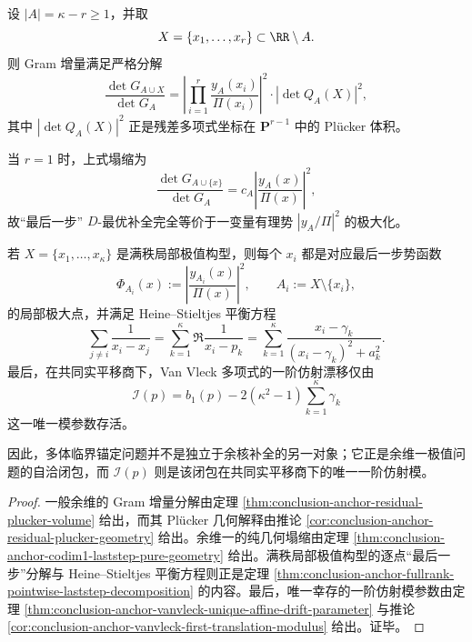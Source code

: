 \begin{theorem}\label{thm:conclusion-anchor-codim-completion-stieltjes-vanvleck-closure}
设 \(|A|=\kappa-r\ge 1\)，并取
\[
X=\{x_1,\dots,x_r\}\subset \RR\setminus A.
\]
则 Gram 增量满足严格分解
\[
\frac{\det G_{A\cup X}}{\det G_A}
=
\left|
\prod_{i=1}^{r}\frac{y_A(x_i)}{\Pi(x_i)}
\right|^2
\cdot
|\det Q_A(X)|^2,
\]
其中 \( |\det Q_A(X)|^2 \) 正是残差多项式坐标在 \(\mathbf P^{r-1}\) 中的 Pl\"ucker 体积。

当 \(r=1\) 时，上式塌缩为
\[
\frac{\det G_{A\cup\{x\}}}{\det G_A}
=
c_A\left|\frac{y_A(x)}{\Pi(x)}\right|^2,
\]
故“最后一步” \(D\)-最优补全完全等价于一变量有理势 \(|y_A/\Pi|^2\) 的极大化。

若 \(X=\{x_1,\dots,x_\kappa\}\) 是满秩局部极值构型，则每个 \(x_i\) 都是对应最后一步势函数
\[
\Phi_{A_i}(x):=\left|\frac{y_{A_i}(x)}{\Pi(x)}\right|^2,
\qquad
A_i:=X\setminus\{x_i\},
\]
的局部极大点，并满足 Heine--Stieltjes 平衡方程
\[
\sum_{j\ne i}\frac{1}{x_i-x_j}
=
\sum_{k=1}^{\kappa}\Re\frac{1}{x_i-p_k}
=
\sum_{k=1}^{\kappa}\frac{x_i-\gamma_k}{(x_i-\gamma_k)^2+a_k^2}.
\]
最后，在共同实平移商下，Van Vleck 多项式的一阶仿射漂移仅由
\[
\mathcal I(p)=
b_1(p)-2(\kappa^2-1)\sum_{k=1}^{\kappa}\gamma_k
\]
这一唯一模参数存活。

因此，多体临界锚定问题并不是独立于余核补全的另一对象；它正是余维一极值问题的自洽闭包，而 \(\mathcal I(p)\) 则是该闭包在共同实平移商下的唯一一阶仿射模。
\end{theorem}
\begin{proof}
一般余维的 Gram 增量分解由定理 \ref{thm:conclusion-anchor-residual-plucker-volume} 给出，而其 Pl\"ucker 几何解释由推论 \ref{cor:conclusion-anchor-residual-plucker-geometry} 给出。余维一的纯几何塌缩由定理 \ref{thm:conclusion-anchor-codim1-laststep-pure-geometry} 给出。满秩局部极值构型的逐点“最后一步”分解与 Heine--Stieltjes 平衡方程则正是定理 \ref{thm:conclusion-anchor-fullrank-pointwise-laststep-decomposition} 的内容。最后，唯一幸存的一阶仿射模参数由定理 \ref{thm:conclusion-anchor-vanvleck-unique-affine-drift-parameter} 与推论 \ref{cor:conclusion-anchor-vanvleck-first-translation-modulus} 给出。证毕。
\end{proof}


